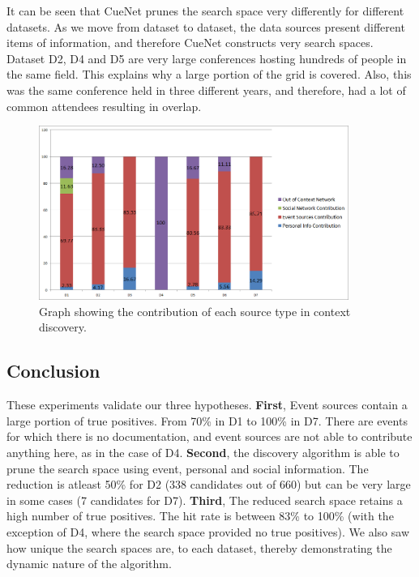 It can be seen that CueNet prunes the search space very differently for different datasets. As we move from dataset to dataset, the data sources present different items of information, and therefore CueNet constructs very search spaces. Dataset D2, D4 and D5 are very large conferences hosting hundreds of people in the same field. This explains why a large portion of the grid is covered. Also, this was the same conference held in three different years, and therefore, had a lot of common attendees resulting in overlap.

\begin{figure}[t]
\centering
\includegraphics[width=0.9\textwidth]{media/discovery-distro-stacked-2.png}
\caption{Graph showing the contribution of each source type in context discovery.}
\label{fig:tag-distribution}
\end{figure}

\subsection{Conclusion}
These experiments validate our three hypotheses. \textbf{First}, Event sources contain a large portion of true positives. From 70\% in D1 to 100\% in D7. There are events for which there is no documentation, and event sources are not able to contribute anything here, as in the case of D4. \textbf{Second}, the discovery algorithm is able to prune the search space using event, personal and social information. The reduction is atleast 50\% for D2 (338 candidates out of 660) but can be very large in some cases (7 candidates for D7). \textbf{Third}, The reduced search space retains a high number of true positives. The hit rate is between 83\% to 100\% (with the exception of D4, where the search space provided no true positives). We also saw how unique the search spaces are, to each dataset, thereby demonstrating the dynamic nature of the algorithm.

